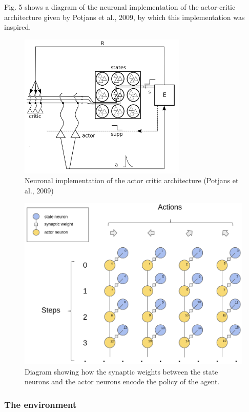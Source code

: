 \documentclass[10pt]{article}
\begin{document}
    Fig. 5 shows a diagram of the neuronal implementation of the actor-critic architecture given by Potjans et al., 2009, by which this implementation was inspired.

    \begin{figure}[ht!]
    \centering
    \includegraphics[width=80mm]{./implementation.png}
    \caption{Neuronal implementation of the actor critic architecture (Potjans et al., 2009)}
    \end{figure}

    \begin{figure}
    \center
    \includegraphics[width=140mm]{./agent.png}
    \caption{Diagram showing how the synaptic weights between the state neurons and the actor neurons encode the policy of the agent.}
    \end{figure}

    \subsubsection{The environment}
\end{document}
